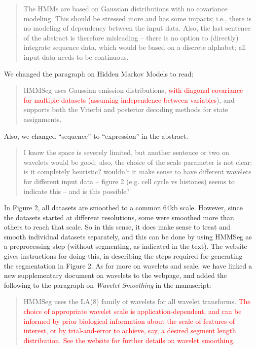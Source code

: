 \documentclass{article}
\newcommand{\breview}{\begin{quotation}\begin{em}\noindent}
\newcommand{\ereview}{\end{em}\end{quotation}}
\begin{document}
\breview
The HMMs are based on Gaussian distributions with no covariance
modeling. This should be stressed more and has some impacts; i.e.,
there is no modeling of dependency between the input data. Also, the
last sentence of the abstract is therefore misleading -- there is no
option to (directly) integrate sequence data, which would be based on
a discrete alphabet; all input data needs to be continuous.
\ereview

We changed the paragraph on Hidden Markov Models to read:

\begin{quotation}
HMMSeg uses Gaussian emission distributions\textcolor{red}{, with
diagonal covariance for multiple datasets (assuming independence
between variables}), and supports both the Viterbi and posterior
decoding methods for state assignments.
\end{quotation}

Also, we changed ``sequence'' to ``expression'' in the abstract.

\breview I know the space is severely limited, but another sentence or
two on wavelets would be good; also, the choice of the scale parameter
is not clear: is it completely heuristic? wouldn't it make sense to
have different wavelets for different input data -- figure 2
(e.g. cell cycle vs histones) seems to indicate this -- and is this
possible?
\ereview

In Figure 2, all datasets are smoothed to a common 64kb scale.
However, since the datasets started at different resolutions, some
were smoothed more than others to reach that scale.  So in this sense,
it does make sense to treat and smooth individual datasets separately,
and this can be done by using HMMSeg as a preprocessing step (without
segmenting, as indicated in the text).  The website gives instructions
for doing this, in describing the steps required for generating the
segmentation in Figure 2.  As for more on wavelets and scale, we have
linked a new supplementary document on wavelets to the webpage, and
added the following to the paragraph on {\em Wavelet Smoothing} in the
manuscript:

\begin{quotation}
HMMSeg uses the LA(8) family of wavelets for all wavelet transforms.
\textcolor{red}{The choice of appropriate wavelet scale is
application-dependent, and can be informed by prior biological
information about the scale of features of interest, or by
trial-and-error to achieve, say, a desired segment length
distribution. See the website for further details on wavelet
smoothing.}\end{quotation}
\end{document}
